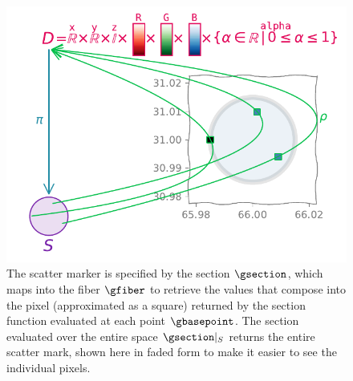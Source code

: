 \documentclass[preprint]{vgtc}
\begin{document}
\begin{figure}
    \includegraphics[width=.5\textwidth]{fb_rho.pdf}
    \caption{The scatter marker is specified by the section $\gsection$, which maps into the fiber $\gfiber$ to retrieve the values that compose into the pixel (approximated as a square) returned by the section function evaluated at each point $\gbasepoint$. The section evaluated over the entire space $\gsection\vert_{S}$ returns the entire scatter mark, shown here in faded form to make it easier to see the individual pixels.}\label{fig:fiber_bundle}
\end{figure}
\end{document}
